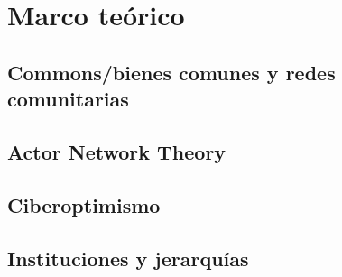 \section{Marco teórico}

\subsection{Commons/bienes comunes y redes comunitarias}

\begin{comment}
## "community"

> The term “community” has played a central role in American affective politics for a long time,
> and as Cherry Schrecker (2006) argues, this thoroughly positive connotation carries, with ex-
> tremely few exceptions, through most of Anglo-Saxon sociology.

* en alemán: más ambiguo (los nacis y la "Volksgemeinschaft")
* español? ("comunidad", "comunitari@");
\end{comment}

\subsection{Actor Network Theory}
\subsection{Ciberoptimismo}

\begin{comment}
community network projects: are to be found in the context of (2nd wave) cyber optimism: "decentralization", "distributed control", "self-governance", "non-hierarchical organization"

## técnica y política

> framing the Internet alternately as lawless, anarchic,
> free, “a world where anyone, anywhere may express his or her beliefs, no matter how singular,
> without fear of being coerced into silence or conformity” (Barlow 1996) (p.1)

* la infraestructura está prerequisito para participación
\end{comment}

\subsection{Instituciones y jerarquías}

\begin{comment}
## statutory vs capillary power

formal establishments / social mechanisms

> Even if there are no institutions (as formal establishments) regulating behavior,
> there are always institutions in the sense of mechanisms,
> rules, and established dynamics.
\end{comment}

